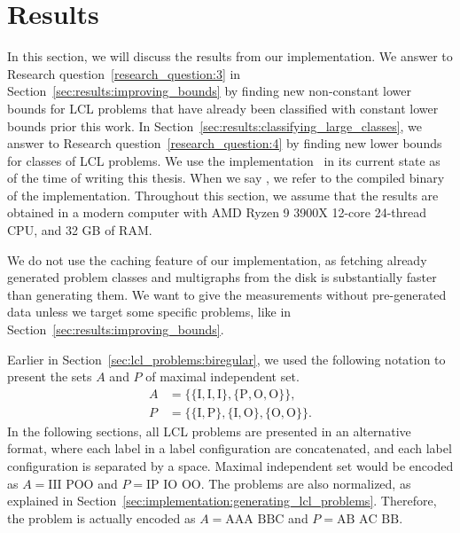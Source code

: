 
\section{Results} \label{sec:results}

\lstset{
  basicstyle=\ttfamily,
  mathescape,
  columns=fixed,
  fontadjust=true,
  basewidth=0.5em
}

In this section, we will discuss the results from our implementation.
We answer to Research question~\ref{research_question:3} in Section~\ref{sec:results:improving_bounds} by finding new non-constant lower bounds for LCL problems that have already been classified with constant lower bounds prior this work.
In Section~\ref{sec:results:classifying_large_classes}, we answer to Research question~\ref{research_question:4} by finding new lower bounds for classes of LCL problems.
We use the implementation~\cite[commit ]{NonconstantLclClassifier2022} in its current state as of the time of writing this thesis.
When we say , we refer to the compiled binary of the implementation.
Throughout this section, we assume that the results are obtained in a modern computer with AMD Ryzen 9 3900X 12-core 24-thread CPU, and 32 GB of RAM.

We do not use the caching feature of our implementation, as fetching already generated problem classes and multigraphs from the disk is substantially faster than generating them.
We want to give the measurements without pre-generated data unless we target some specific problems, like in Section~\ref{sec:results:improving_bounds}.

Earlier in Section~\ref{sec:lcl_problems:biregular}, we used the following notation to present the sets $A$ and $P$ of maximal independent set.
\begin{align*}
    A &= \mathrm{\{\{I,I,I\},\{P,O,O\}\}}, \\
    P &= \mathrm{\{\{I,P\},\{I,O\},\{O,O\}\}}.
  \end{align*}
In the following sections, all LCL problems are presented in an alternative format, where each label in a label configuration are concatenated, and each label configuration is separated by a space.
Maximal independent set would be encoded as
$A = \text{III POO}$ and $P = \text{IP IO OO}$.
The problems are also normalized, as explained in Section~\ref{sec:implementation:generating_lcl_problems}.
Therefore, the problem is actually encoded as $A = \text{AAA BBC}$ and $P = \text{AB AC BB}$.


